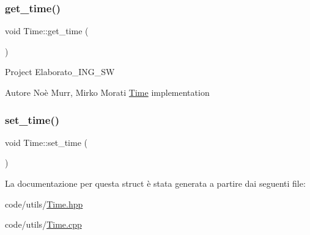 \subsubsection{\texorpdfstring{get\+\_\+time()}{get\_time()}}
{\footnotesize\ttfamily void Time\+::get\+\_\+time (\begin{DoxyParamCaption}{ }\end{DoxyParamCaption})}

Project Elaborato\+\_\+\+I\+N\+G\+\_\+\+SW \begin{DoxyAuthor}{Autore}
Noè Murr, Mirko Morati \mbox{\hyperlink{struct_time}{Time}} implementation 
\end{DoxyAuthor}
\mbox{\label{struct_time_a76fe3565c8497fe80720123aa0b988fb}} 
\subsubsection{\texorpdfstring{set\+\_\+time()}{set\_time()}}
{\footnotesize\ttfamily void Time\+::set\+\_\+time (\begin{DoxyParamCaption}{ }\end{DoxyParamCaption})}



La documentazione per questa struct è stata generata a partire dai seguenti file\+:\begin{DoxyCompactItemize}
\item 
code/utils/\mbox{\hyperlink{_time_8hpp}{Time.\+hpp}}\item 
code/utils/\mbox{\hyperlink{_time_8cpp}{Time.\+cpp}}\end{DoxyCompactItemize}
